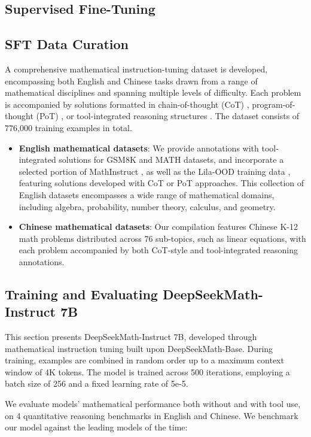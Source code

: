 \begin{itemize}[topsep=0pt]
\section{Supervised Fine-Tuning}

\subsection{SFT Data Curation}

A comprehensive mathematical instruction-tuning dataset is developed, encompassing both English and Chinese tasks drawn from a range of mathematical disciplines and spanning multiple levels of difficulty. Each problem is accompanied by solutions formatted in chain-of-thought (CoT) \citep{cot}, program-of-thought (PoT) \citep{pot,pal}, or tool-integrated reasoning structures \citep{tora}. The dataset consists of 776,000 training examples in total.

\begin{itemize}[topsep=0pt]
    \item \textbf{English mathematical datasets}: We provide annotations with tool-integrated solutions for GSM8K and MATH datasets, and incorporate a selected portion of MathInstruct \citep{MathInstruct}, as well as the Lila-OOD training data \citep{lila}, featuring solutions developed with CoT or PoT approaches. This collection of English datasets encompasses a wide range of mathematical domains, including algebra, probability, number theory, calculus, and geometry.
    \item \textbf{Chinese mathematical datasets}: Our compilation features Chinese K-12 math problems distributed across 76 sub-topics, such as linear equations, with each problem accompanied by both CoT-style and tool-integrated reasoning annotations.
\end{itemize}

\subsection{Training and Evaluating DeepSeekMath-Instruct 7B}

This section presents DeepSeekMath-Instruct 7B, developed through mathematical instruction tuning built upon DeepSeekMath-Base. During training, examples are combined in random order up to a maximum context window of 4K tokens. The model is trained across 500 iterations, employing a batch size of 256 and a fixed learning rate of 5e-5.

We evaluate models' mathematical performance both without and with tool use, on 4 quantitative reasoning benchmarks in English and Chinese. We benchmark our model against the leading models of the time:


\end{itemize}
